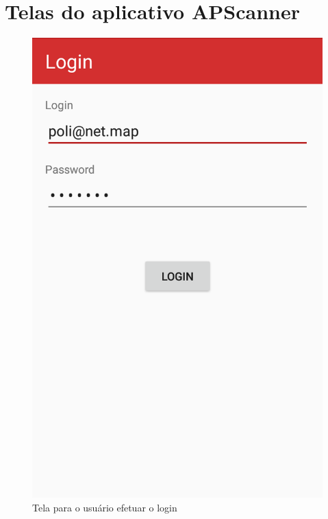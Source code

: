 \chapter{Telas do aplicativo APScanner}
\label{anexo:telasApscanner}

\begin{figure}[H]
  \centering
  \begin{minipage}[b]{0.4\textwidth}
    \includegraphics[width=\textwidth]{imagens/screenshots/telaLogin.png}
    \caption{Tela para o usuário efetuar o login}
  \end{minipage}
  \hfill
  \begin{minipage}[b]{0.4\textwidth}

\end{minipage}
\end{figure}
